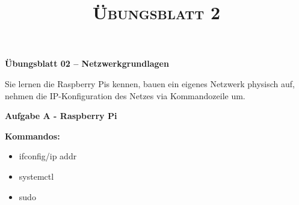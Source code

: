 \documentclass[paper=a4,fontsize=11pt]{scrartcl}%
\title{	
\normalfont \normalsize 
\textsc{Übungsblatt 2}
}
\numberwithin{equation}{section}
\begin{document}
\begin{center}
\Large{\textbf{Übungsblatt 02 -- Netzwerkgrundlagen}}
\end{center}
Sie lernen die Raspberry Pis kennen, bauen ein eigenes Netzwerk physisch auf, nehmen die IP-Konfiguration des Netzes via Kommandozeile um.
\begin{center}\Large{\textbf{Aufgabe A - Raspberry Pi}}\end{center}\vskip0.25in
\textbf{Kommandos:}
\begin{multicols}{3}
\begin{itemize}
	\item ifconfig/ip addr
	\item systemctl
	\item sudo
\end{itemize}
\end{multicols}
\end{document}
